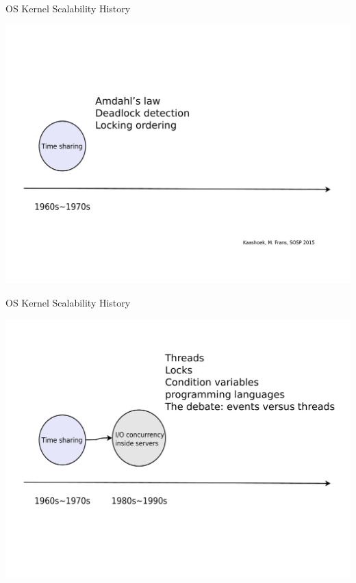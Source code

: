 \documentclass[english]{beamer} %
\begin{document}
\begin{frame}{OS Kernel Scalability History}
\begin{center}
\includegraphics[scale=0.3]{fig/history_old_60s}
\end{center}
\end{frame}




\begin{frame}{OS Kernel Scalability History}
\begin{center}
\includegraphics[scale=0.3]{fig/history_old_80s}
\end{center}
\end{frame}
\end{document}
